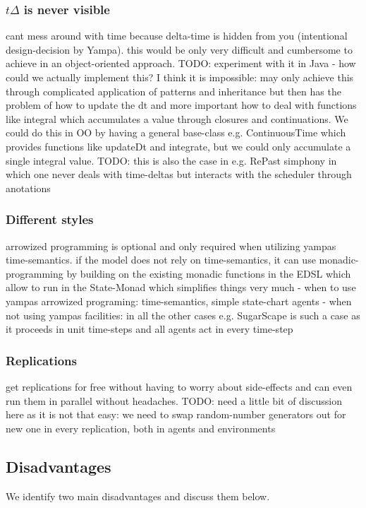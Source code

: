 \subsubsection{$t\Delta$ is never visible}
cant mess around with time because delta-time is hidden from you (intentional design-decision by Yampa). this would be only very difficult and cumbersome to achieve in an object-oriented approach. TODO: experiment with it in Java - how could we actually implement this? I think it is impossible: may only achieve this through complicated application of patterns and inheritance but then has the problem of how to update the dt and more important how to deal with functions like integral which accumulates a value through closures and continuations. We could do this in OO by having a general base-class e.g. ContinuousTime which provides functions like updateDt and integrate, but we could only accumulate a single integral value.
TODO: this is also the case in e.g. RePast simphony in which one never deals with time-deltas but interacts with the scheduler through anotations

\subsubsection{Different styles}
arrowized programming is optional and only required when utilizing yampas time-semantics. if the model does not rely on time-semantics, it can use monadic-programming by building on the existing monadic functions in the EDSL which allow to run in the State-Monad which simplifies things very much
	- when to use yampas arrowized programing: time-semantics, simple state-chart agents 
	- when not using yampas facilities: in all the other cases e.g. SugarScape is such a case as it proceeds in unit time-steps and all agents act in every time-step

\subsubsection{Replications}
get replications for free without having to worry about side-effects and can even run them in parallel without headaches. TODO: need a little bit of discussion here as it is not that easy: we need to swap random-number generators out for new one in every replication, both in agents and environments

\subsection{Disadvantages}
We identify two main disadvantages and discuss them below.

